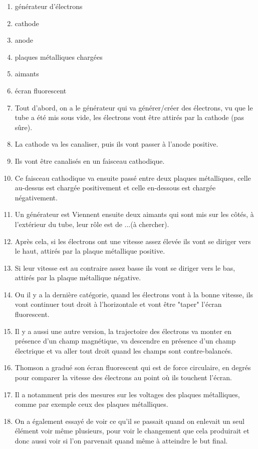 \documentclass[../main.tex]{subfiles}
\begin{document}
\begin{enumerate}
    \item générateur d'électrons
    \item cathode
    \item anode
    \item plaques métalliques chargées
    \item aimants
    \item écran fluorescent
    \item Tout d'abord, on a le générateur qui va générer/créer des électrons, vu que le tube a été mis sous vide, les électrons vont être attirés par la cathode (pas sûre).
    \item  La cathode va les canaliser, puis ils vont passer à l'anode positive.
    \item  Ils vont être canalisés en un faisceau cathodique.\\
    \item Ce faisceau cathodique va ensuite passé entre deux plaques métalliques, celle au-dessus est chargée positivement et celle en-dessous est chargée négativement.
    \item  Un générateur est Viennent ensuite deux aimants qui sont mis sur les côtés, à l'extérieur du tube, leur rôle est de ...(à chercher).
    \item Après cela, si les électrons ont une vitesse assez élevée ils vont se diriger vers le haut, attirés par la plaque métallique positive.
    \item  Si leur vitesse est au contraire assez basse ils vont se diriger vers le bas, attirés par la plaque métallique négative.
    \item Ou il y a la dernière catégorie, quand les électrons vont à la bonne vitesse, ils vont continuer tout droit à l'horizontale et vont être "taper" l'écran fluorescent.
    \item Il y a aussi une autre version, la trajectoire des électrons va monter en présence d'un champ magnétique, va descendre en présence d'un champ électrique et  va aller tout droit quand les champs sont contre-balancés. 
    \item Thomson a gradué son écran fluorescent qui est de force circulaire, en degrés pour comparer la vitesse des électrons au point où ils touchent l'écran. 
    \item Il a notamment pris des mesures sur les voltages des plaques métalliques, comme par exemple ceux des plaques métalliques. 
    \item On a également essayé de voir ce qu'il se passait quand on enlevait un seul élément voir même plusieurs, pour voir le changement que cela produirait et donc aussi voir si l'on parvenait quand même à atteindre le but final.

\end{enumerate}
\end{document}
